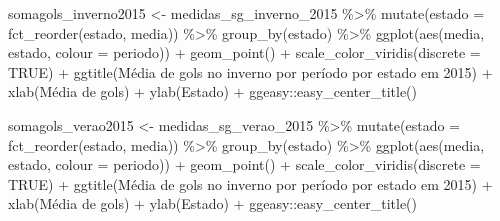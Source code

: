 \documentclass[
]{article}
\newenvironment{Shaded}{\begin{snugshade}}{\end{snugshade}}
\newcommand{\AttributeTok}[1]{\textcolor[rgb]{0.77,0.63,0.00}{#1}}
\newcommand{\ConstantTok}[1]{\textcolor[rgb]{0.00,0.00,0.00}{#1}}
\newcommand{\FunctionTok}[1]{\textcolor[rgb]{0.00,0.00,0.00}{#1}}
\newcommand{\NormalTok}[1]{#1}
\newcommand{\OtherTok}[1]{\textcolor[rgb]{0.56,0.35,0.01}{#1}}
\newcommand{\SpecialCharTok}[1]{\textcolor[rgb]{0.00,0.00,0.00}{#1}}
\newcommand{\StringTok}[1]{\textcolor[rgb]{0.31,0.60,0.02}{#1}}
\begin{document}
\begin{Shaded}
\begin{Highlighting}[]
\NormalTok{somagols\_inverno2015 }\OtherTok{\textless{}{-}}\NormalTok{ medidas\_sg\_inverno\_2015 }\SpecialCharTok{\%\textgreater{}\%} \FunctionTok{mutate}\NormalTok{(}\AttributeTok{estado =} \FunctionTok{fct\_reorder}\NormalTok{(estado, media)) }\SpecialCharTok{\%\textgreater{}\%} 
  \FunctionTok{group\_by}\NormalTok{(estado) }\SpecialCharTok{\%\textgreater{}\%}
  \FunctionTok{ggplot}\NormalTok{(}\FunctionTok{aes}\NormalTok{(media, estado, }\AttributeTok{colour =}\NormalTok{ periodo)) }\SpecialCharTok{+} \FunctionTok{geom\_point}\NormalTok{() }\SpecialCharTok{+}
  \FunctionTok{scale\_color\_viridis}\NormalTok{(}\AttributeTok{discrete =} \ConstantTok{TRUE}\NormalTok{) }\SpecialCharTok{+}
  \FunctionTok{ggtitle}\NormalTok{(}\StringTok{\textquotesingle{}Média de gols no inverno por período por estado em 2015\textquotesingle{}}\NormalTok{) }\SpecialCharTok{+} 
  \FunctionTok{xlab}\NormalTok{(}\StringTok{\textquotesingle{}Média de gols\textquotesingle{}}\NormalTok{) }\SpecialCharTok{+} \FunctionTok{ylab}\NormalTok{(}\StringTok{\textquotesingle{}Estado\textquotesingle{}}\NormalTok{) }\SpecialCharTok{+}
\NormalTok{  ggeasy}\SpecialCharTok{::}\FunctionTok{easy\_center\_title}\NormalTok{() }

\NormalTok{somagols\_verao2015 }\OtherTok{\textless{}{-}}\NormalTok{ medidas\_sg\_verao\_2015 }\SpecialCharTok{\%\textgreater{}\%} \FunctionTok{mutate}\NormalTok{(}\AttributeTok{estado =} \FunctionTok{fct\_reorder}\NormalTok{(estado, media)) }\SpecialCharTok{\%\textgreater{}\%} 
  \FunctionTok{group\_by}\NormalTok{(estado) }\SpecialCharTok{\%\textgreater{}\%}
  \FunctionTok{ggplot}\NormalTok{(}\FunctionTok{aes}\NormalTok{(media, estado, }\AttributeTok{colour =}\NormalTok{ periodo)) }\SpecialCharTok{+} \FunctionTok{geom\_point}\NormalTok{() }\SpecialCharTok{+}
  \FunctionTok{scale\_color\_viridis}\NormalTok{(}\AttributeTok{discrete =} \ConstantTok{TRUE}\NormalTok{) }\SpecialCharTok{+}
  \FunctionTok{ggtitle}\NormalTok{(}\StringTok{\textquotesingle{}Média de gols no inverno por período por estado em 2015\textquotesingle{}}\NormalTok{) }\SpecialCharTok{+} 
  \FunctionTok{xlab}\NormalTok{(}\StringTok{\textquotesingle{}Média de gols\textquotesingle{}}\NormalTok{) }\SpecialCharTok{+} \FunctionTok{ylab}\NormalTok{(}\StringTok{\textquotesingle{}Estado\textquotesingle{}}\NormalTok{) }\SpecialCharTok{+}
\NormalTok{  ggeasy}\SpecialCharTok{::}\FunctionTok{easy\_center\_title}\NormalTok{() }


\end{Highlighting}
\end{Shaded}
\end{document}
